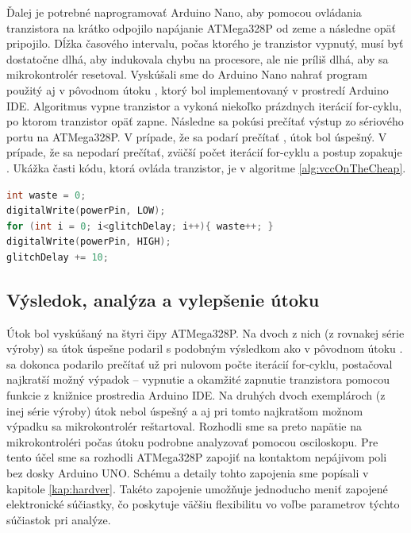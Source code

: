 Ďalej je potrebné naprogramovať Arduino Nano, aby pomocou ovládania tranzistora na krátko odpojilo napájanie ATMega328P od zeme a následne opäť pripojilo. Dĺžka časového intervalu, počas ktorého je tranzistor vypnutý, musí byť dostatočne dlhá, aby indukovala chybu na procesore, ale nie príliš dlhá, aby sa mikrokontrolér resetoval. Vyskúšali sme do Arduino Nano nahrať program použitý aj v pôvodnom útoku \cite{vccOnTheCheap}, ktorý bol implementovaný v prostredí Arduino IDE. Algoritmus vypne tranzistor a vykoná niekoľko prázdnych iterácií for-cyklu, po ktorom tranzistor opäť zapne. Následne sa pokúsi prečítať výstup zo sériového portu na ATMega328P. V prípade, že sa podarí prečítať , útok bol úspešný. V prípade, že sa  nepodarí prečítať, zväčší počet iterácií for-cyklu a postup zopakuje \cite{vccOnTheCheap}. Ukážka časti kódu, ktorá ovláda tranzistor, je v algoritme \ref{alg:vccOnTheCheap}.

\begin{lstlisting}[float,language=C,caption={Ovládanie tranzistora, ktorý spína napájanie na ATMega328P. Prevzaté zo zdrojového kódu pôvodného útoku \cite{vccOnTheCheap}.},label=alg:vccOnTheCheap]
int waste = 0;
digitalWrite(powerPin, LOW);
for (int i = 0; i<glitchDelay; i++){ waste++; }                    
digitalWrite(powerPin, HIGH);
glitchDelay += 10;
\end{lstlisting}

\subsection{Výsledok, analýza a vylepšenie útoku}
Útok bol vyskúšaný na štyri čipy ATMega328P. Na dvoch z nich (z rovnakej série výroby) sa útok úspešne podaril s podobným výsledkom ako v pôvodnom útoku \cite{vccOnTheCheap}.  sa dokonca podarilo prečítať už pri nulovom počte iterácií for-cyklu, postačoval najkratší možný výpadok -- vypnutie a okamžité zapnutie tranzistora pomocou funkcie  z knižnice prostredia Arduino IDE. Na druhých dvoch exemplároch (z inej série výroby) útok nebol úspešný a aj pri tomto najkratšom možnom výpadku sa mikrokontrolér reštartoval. Rozhodli sme sa preto napätie na mikrokontroléri počas útoku podrobne analyzovať pomocou osciloskopu. Pre tento účel sme sa rozhodli ATMega328P zapojiť na kontaktom nepájivom poli bez dosky Arduino UNO. Schému a detaily tohto zapojenia sme popísali v kapitole \ref{kap:hardver}. Takéto zapojenie umožňuje jednoducho meniť zapojené elektronické súčiastky, čo poskytuje väčšiu flexibilitu vo voľbe parametrov týchto súčiastok pri analýze.

